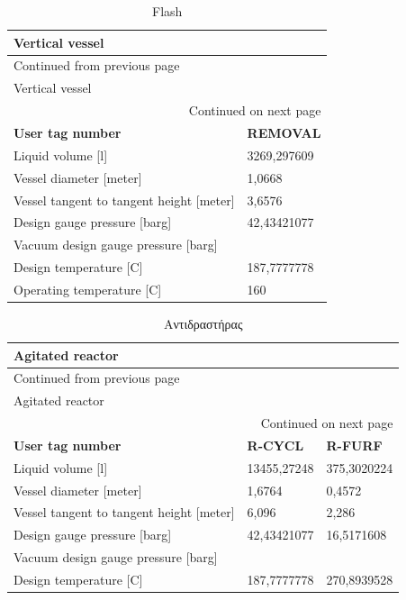 \documentclass[11pt]{article}
\begin{document}
\begin{longtable}{ll}
\caption{Flash}
\\
Vertical vessel & \\
\hline
\endfirsthead
\multicolumn{2}{l}{Continued from previous page} \\
\hline

Vertical vessel &  \\

\hline
\endhead
\hline\multicolumn{2}{r}{Continued on next page} \\
\endfoot
\endlastfoot
\hline
\textbf{User tag number} & \textbf{REMOVAL}\\
Liquid volume [l] & 3269,297609\\
Vessel diameter [meter] & 1,0668\\
Vessel tangent to tangent height [meter] & 3,6576\\
Design gauge pressure [barg] & 42,43421077\\
Vacuum design gauge pressure [barg] & \\
Design temperature [C] & 187,7777778\\
Operating temperature [C] & 160\\
\end{longtable}

\begin{longtable}{lll}
\caption{Αντιδραστήρας}
\\
Agitated reactor &  & \\
\hline
\endfirsthead
\multicolumn{3}{l}{Continued from previous page} \\
\hline

Agitated reactor &  &  \\

\hline
\endhead
\hline\multicolumn{3}{r}{Continued on next page} \\
\endfoot
\endlastfoot
\hline
\textbf{User tag number} & \textbf{R-CYCL} & \textbf{R-FURF}\\
Liquid volume [l] & 13455,27248 & 375,3020224\\
Vessel diameter [meter] & 1,6764 & 0,4572\\
Vessel tangent to tangent height [meter] & 6,096 & 2,286\\
Design gauge pressure [barg] & 42,43421077 & 16,5171608\\
Vacuum design gauge pressure [barg] &  & \\
Design temperature [C] & 187,7777778 & 270,8939528\\
\end{longtable}
\end{document}
